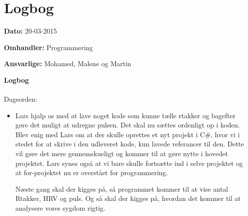 \chapter{Logbog}

\textbf{Dato:} 20-03-2015

\textbf{Omhandler:} Programmering

\textbf{Ansvarlige:} Mohamed, Malene og Martin

\textbf{Logbog}
\\
\\
Dagsorden:
\begin{itemize}
	\item Lars hjalp os med at lave noget kode som kunne tælle rtakker og bagefter gøre det muligt at udregne pulsen. Det skal nu sættes ordenligt op i koden. Blev enig med Lars om at der skulle oprettes et nyt projekt i C#, hvor vi i stedet for at skrive i den udleveret kode, kun lavede referancer til den. Dette vil gøre det mere gennemskueligt og kommer til at gøre nytte i hovedet projektet. Lars synes også at vi bare skulle fortsætte ind i selve projektet og at for-projektet nu er overstået for programmering.
	
	Næste gang skal der kigges på, så programmet kommer til at vise antal Rtakker, HRV og puls. Og så skal der kigges på, hvordan det kommer til at analysere vores sygdom rigtig.
\end{itemize}


